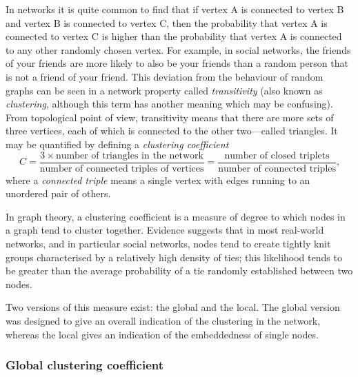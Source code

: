       In networks it is quite common to find that if vertex A is connected to vertex B and vertex B is connected to vertex C, then the probability that vertex A is connected to vertex C is higher than the probability that vertex A is connected to any other randomly chosen vertex. For example, in social networks, the friends of your friends are more likely to also be your friends than a random person that is not a friend of your friend. This deviation from the behaviour of random graphs can be seen in a network property called \emph{transitivity} (also known as \emph{clustering}, although this term has another meaning which may be confusing). From topological point of view, transitivity means that there are more sets of three vertices, each of which is connected to the other two---called triangles. It may be quantified by defining a \emph{clustering coefficient}
      \begin{equation}
        C = \frac{3 \times \mbox{number of triangles in the network}}{\mbox{number of connected triples of vertices}} = \frac{\mbox{number of closed triplets}}{\mbox{number of connected triples}} \mbox{,}
      \end{equation}
      where a \emph{connected triple} means a single vertex with edges running to an unordered pair of others.

      In graph theory, a clustering coefficient is a measure of degree to which nodes in a graph tend to cluster together. Evidence suggests that in most real-world networks, and in particular social networks, nodes tend to create tightly knit groups characterised by a relatively high density of ties; this likelihood tends to be greater than the average probability of a tie randomly established between two nodes\cite{HollandLeinhardt1971,WattsStrogatz1998}.

      Two versions of this measure exist: the global and the local. The global version was designed to give an overall indication of the clustering in the network, whereas the local gives an indication of the embeddedness of single nodes.

      \subsubsection{Global clustering coefficient}

